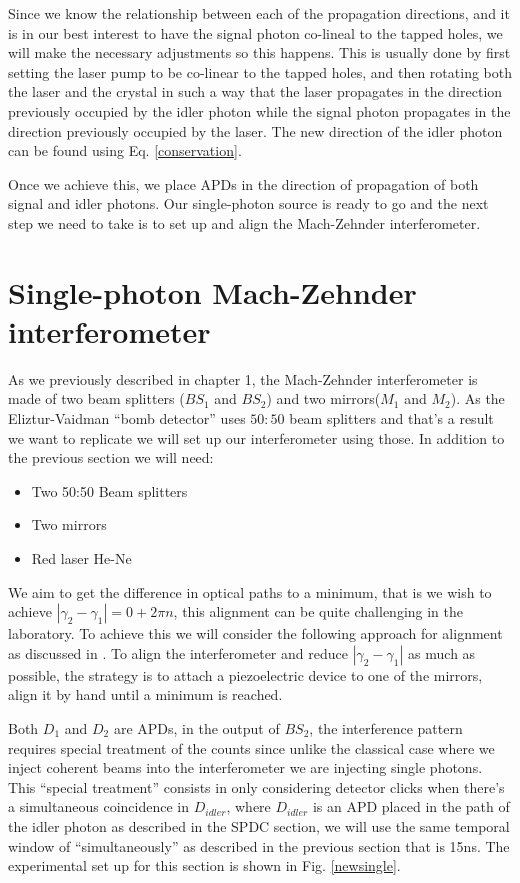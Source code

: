 \documentclass[12pt]{book}
\begin{document}
Since we know the relationship between each of the propagation directions, and it is in our best interest to have the signal photon co-lineal to the tapped holes, we will make the necessary adjustments so this happens. This is usually done by first setting the laser pump to be co-linear to the tapped holes, and then rotating both the laser and the crystal in such a way that the laser propagates in the direction previously occupied by the idler photon while the signal photon propagates in the direction previously occupied by the laser. The new direction of the idler photon can be found using Eq. \ref{conservation}.

Once we achieve this, we place APDs in the direction of propagation of both signal and idler photons. Our single-photon source is ready to go and the next step we need to take is to set up and align the Mach-Zehnder interferometer.

\section{Single-photon Mach-Zehnder interferometer}

As we previously described in chapter 1, the Mach-Zehnder interferometer is made of two beam splitters ($BS_{1}$ and $BS_{2}$) and two mirrors($M_{1}$ and $M_{2}$). As the Eliztur-Vaidman ``bomb detector'' uses $50:50$ beam splitters and that's a result we want to replicate we will set up our interferometer using those. In addition to the previous section we will need:

\begin{itemize}
\item Two 50:50 Beam splitters
\item Two mirrors
\item Red laser He-Ne

\end{itemize}

We aim to get the difference in optical paths to a minimum, that is we wish to achieve $|\gamma_{2}-\gamma_{1}|=0+2\pi n$, this alignment can be quite challenging in the laboratory. To achieve this we will consider the following approach for alignment as discussed in \cite{zuri}. To align the interferometer and reduce $|\gamma_{2}-\gamma_{1}|$ as much as possible, the strategy is to attach a piezoelectric device to one of the mirrors, align it by hand  until a minimum is reached.

Both $D_{1}$ and $D_{2}$ are APDs, in the output of  $BS_{2}$, the interference pattern requires special treatment of the counts since unlike the classical case where we inject coherent beams into the interferometer we are injecting single photons. This ``special treatment'' consists in only considering detector clicks when there's a simultaneous coincidence in $D_{idler}$, where $D_{idler}$ is an APD placed in the path of the idler photon as described in the SPDC section, we will use the same temporal window of ``simultaneously'' as described in the previous section that is 15ns. The experimental set up for this section is shown in Fig. \ref{newsingle}.
\end{document}
